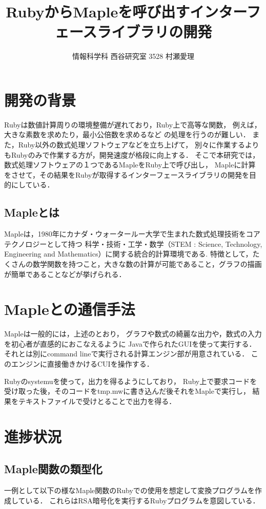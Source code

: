 \documentclass[10pt,a4j,twocolumn]{jsarticle}
\begin{document}
\title{RubyからMapleを呼び出すインターフェースライブラリの開発}
\author{情報科学科 西谷研究室 3528 村瀬愛理}
\date{}
\maketitle
\section{開発の背景}
Rubyは数値計算周りの環境整備が遅れており，Ruby上で高等な関数，
例えば，大きな素数を求めたり，最小公倍数を求めるなど
の処理を行うのが難しい．
また，Ruby以外の数式処理ソフトウェアなどを立ち上げて，
別々に作業するよりもRubyのみで作業する方が，開発速度が格段に向上する．
そこで本研究では，数式処理ソフトウェアの１つであるMapleをRuby上で呼び出し，
Mapleに計算をさせて，その結果をRubyが取得するインターフェースライブラリの開発を目的にしている．

\subsection{Mapleとは}
Mapleは，1980年にカナダ・ウォータールー大学で生まれた数式処理技術をコアテクノロジーとして持つ
科学・技術・工学・数学（STEM : Science, Technology, Engineering and Mathematics）に関する統合的計算環境である\cite{Maple}.
特徴として，たくさんの数学関数を持つこと，大きな数の計算が可能であること，グラフの描画が簡単であることなどが挙げられる．

\section{Mapleとの通信手法}
Mapleは一般的には，上述のとおり，
グラフや数式の綺麗な出力や，数式の入力を初心者が直感的におこなえるように
Javaで作られたGUIを使って実行する．
それとは別にcommand lineで実行される計算エンジン部が用意されている．
このエンジンに直接働きかけるCUIを操作する．

Rubyのsystemuを使って，出力を得るようにしており，
Ruby上で要求コードを受け取った後，そのコードをtmp.mwに書き込んだ後それをMapleで実行し，
結果をテキストファイルで受けとることで出力を得る．

\section{進捗状況}
\subsection{Maple関数の類型化}
一例として以下の様なMaple関数のRubyでの使用を想定して変換プログラムを作成している．
これらはRSA暗号化を実行するRubyプログラムを意図している．
\end{document}
